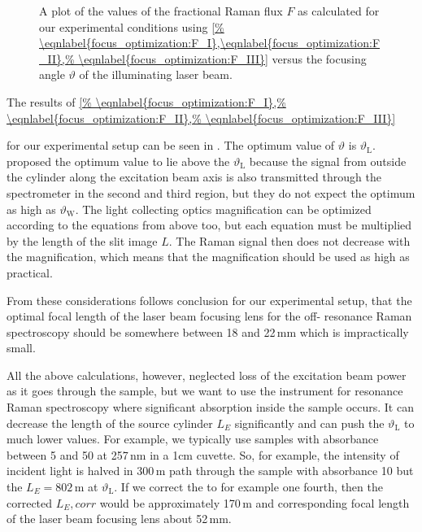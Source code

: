 \begin{figure}
	\centering
	
	\caption{A plot of the values of the fractional Raman flux $F$ as calculated
	for our experimental conditions using \cref{%
		\eqnlabel{focus_optimization:F_I},\eqnlabel{focus_optimization:F_II},%
		\eqnlabel{focus_optimization:F_III}}
	versus the focusing angle $\vartheta$ of the
	illuminating laser beam.}
	\label{\figlabel{focus_optimization:F}}
\end{figure}

The results of \cref{%
		\eqnlabel{focus_optimization:F_I},%
		\eqnlabel{focus_optimization:F_II},%
		\eqnlabel{focus_optimization:F_III}}

for our experimental setup can be seen in . The
optimum value of $\vartheta$ is $\vartheta_\text{L}$. \textcite{Barrett1968}
proposed the optimum value to lie above the $\vartheta_\text{L}$ because the
signal from outside the cylinder along the excitation beam axis is also
transmitted through the spectrometer in the second and third region, but they
do not expect the optimum as high as $\vartheta_\text{W}$. The light
collecting optics magnification can be optimized according to the equations
from above too, but each equation must be multiplied by the length of the
slit image $L$. The Raman signal then does not decrease with the
magnification, which means that the magnification should be used as high as
practical.

From these considerations follows conclusion for our experimental setup, that
the optimal focal length of the laser beam focusing lens for the off-
resonance Raman spectroscopy should be somewhere between 18 and 22\,mm which
is impractically small.

All the above calculations, however, neglected loss of the excitation beam
power as it goes through the sample, but we want to use the instrument for
resonance Raman spectroscopy where significant absorption inside the sample
occurs. It can decrease the length of the source cylinder $L_E$ significantly
and can push the $\vartheta_\text{L}$ to much lower values. For example, we
typically use samples with absorbance between 5 and 50 at 257\,nm in a 1cm
cuvette. So, for example, the intensity of incident light is halved in
300\,m path through the sample with absorbance 10 but the
$L_E = 802$\,m at $\vartheta_\text{L}$. If we correct the
 to for example one fourth, then the
corrected $L_E,corr$ would be approximately 170\,m and corresponding
focal length of the laser beam focusing lens about 52\,mm.

